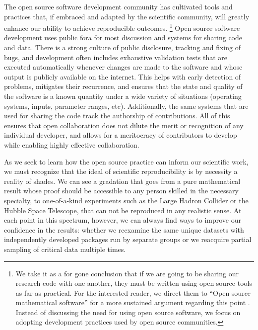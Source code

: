\documentclass[ChapterTOCs,krantz2]{krantz} %
\begin{document}
The open source software development community has cultivated tools and
practices that, if embraced and adapted by the scientific community, will
greatly enhance our ability to achieve reproducible outcomes.
\footnote{We take it as a for gone conclusion that if we are going to
 be sharing our research code with one another, they must be written using open
 source tools as far as practical. For the interested reader, we direct them to
 ``Open source mathematical software'' for a more sustained argument regarding
 this point \cite{joyner2007open}. Instead of discussing the need for using
 open source software, we focus on adopting development practices used
 by open source communities.}
Open source software development uses public fora for most discussion and
systems for sharing code and data. There is a strong culture of public
disclosure, tracking and fixing of bugs, and development often includes
exhaustive validation tests that are executed automatically whenever changes
are made to the software and whose output is publicly available on the
internet. This helps with early detection of problems, mitigates their
recurrence, and ensures that the state and quality of the software is a known
quantity under a wide variety of situations (operating systems, inputs,
parameter ranges, etc).  Additionally, the same systems that are used for
sharing the code track the authorship of contributions. All of this ensures
that open collaboration does not dilute the merit or recognition of any
individual developer, and allows for a meritocracy of contributors to develop
while enabling highly effective collaboration.

As we seek to learn how the open source practice can inform our scientific
work, we must recognize that the ideal of scientific reproducibility
is by necessity a reality of shades. We can see a gradation that goes
from a pure mathematical result whose proof should be accessible to
any person skilled in the necessary specialty, to one-of-a-kind experiments
such as the Large Hadron Collider or the Hubble Space Telescope, that
can not be reproduced in any realistic sense. At each point in this
spectrum, however, we can always find ways to improve our confidence
in the results: whether we reexamine the same unique datasets with
independently developed packages run by separate groups or we reacquire
partial sampling of critical data multiple times.
\end{document}
